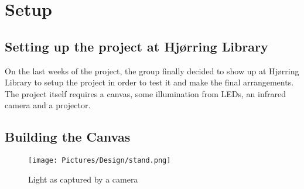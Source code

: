 \section{Setup}
\subsection{Setting up the project at Hj{\o}rring Library}
On the last weeks of the project, the group finally decided to show up at Hj{\o}rring Library to setup the project in order to test it and make the final arrangements. The project itself requires a canvas, some illumination from LEDs, an infrared camera and a projector.
\subsection{Building the Canvas}

\begin{figure}[htbp] 
\centering 
\texttt{[image: Pictures/Design/stand.png]} 
\caption{Light as captured by a camera} 
\label{fig:standPosition} 
\end{figure}